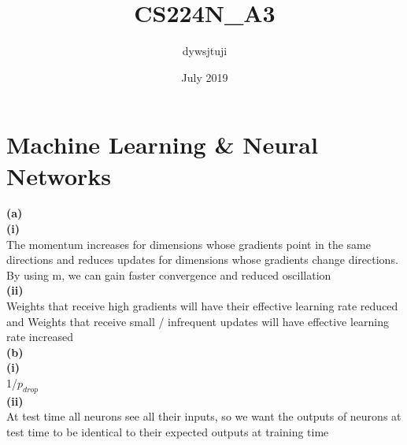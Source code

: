 \documentclass{article}
\title{CS224N_A3}
\author{dywsjtuji }
\date{July 2019}
\begin{document}
\maketitle

\section{Machine Learning & Neural Networks}

\textbf{(a)}\\
\textbf{(i)}\\
The momentum increases for dimensions whose gradients point in the same directions and reduces updates for dimensions whose gradients change directions. By using m, we can gain faster convergence and reduced oscillation
\\
\textbf{(ii)}\\
Weights that receive high gradients will have their effective learning rate reduced and Weights that receive small / infrequent updates will have effective learning rate increased\\
\textbf{(b)}\\
\textbf{(i)}\\
 1/${p_{drop}}$\\
\textbf{(ii)}\\
At test time all neurons see all their inputs, so we want the outputs of neurons at test time to be identical to their expected outputs at training time
\end{document}
